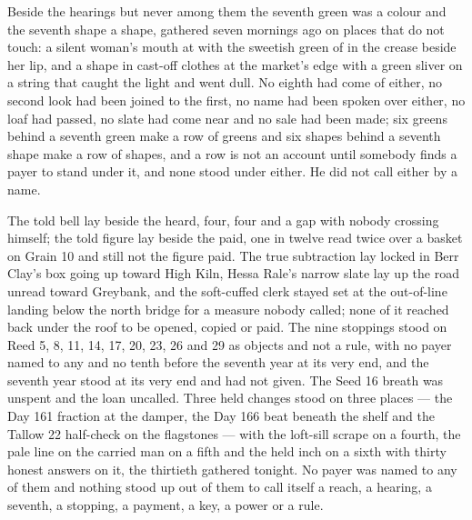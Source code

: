 Beside the hearings but never among them the seventh green was a colour and the seventh shape a shape, gathered seven mornings ago on places that do not touch: a silent woman's mouth at  with the sweetish green of  in the crease beside her lip, and a shape in cast-off clothes at the market's edge with a green sliver on a string that caught the light and went dull. No eighth had come of either, no second look had been joined to the first, no name had been spoken over either, no loaf had passed, no slate had come near and no sale had been made; six greens behind a seventh green make a row of greens and six shapes behind a seventh shape make a row of shapes, and a row is not an account until somebody finds a payer to stand under it, and none stood under either. He did not call either by a name.

The told bell lay beside the heard, four, four and a gap with nobody crossing himself; the told figure lay beside the paid, one in twelve read twice over a basket on Grain 10 and still not the figure paid. The true subtraction lay locked in Berr Clay's box going up toward High Kiln, Hessa Rale's narrow slate lay up the road unread toward Greybank, and the soft-cuffed clerk stayed set at the out-of-line landing below the north bridge for a measure nobody called; none of it reached back under the roof to be opened, copied or paid. The nine stoppings stood on Reed 5, 8, 11, 14, 17, 20, 23, 26 and 29 as objects and not a rule, with no payer named to any and no tenth before the seventh year at its very end, and the seventh year stood at its very end and had not given. The Seed 16 breath was unspent and the loan uncalled. Three held changes stood on three places --- the Day 161 fraction at the damper, the Day 166 beat beneath the shelf and the Tallow 22 half-check on the flagstones --- with the loft-sill scrape on a fourth, the pale line on the carried man on a fifth and the held inch on a sixth with thirty honest answers on it, the thirtieth gathered tonight. No payer was named to any of them and nothing stood up out of them to call itself a reach, a hearing, a seventh, a stopping, a payment, a key, a power or a rule.

